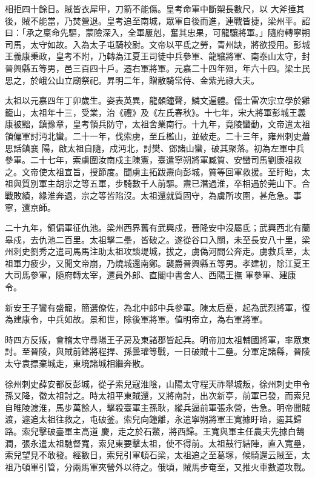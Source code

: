 \begin{pinyinscope}
 相拒四十餘日。賊皆衣犀甲，刀箭不能傷。皇考命軍中斷槊長數尺，以
 大斧捶其後，賊不能當，乃焚營退。皇考追至南城，眾軍自後而進，連戰皆捷，梁州平。詔曰：「承之稟命先驅，蒙險深入，全軍屢剋，奮其忠果，可龍驤將軍。」隨府轉寧朔司馬，太守如故。入為太子屯騎校尉。文帝以平氐之勞，青州缺，將欲授用。彭城王義康秉政，皇考不附，乃轉為江夏王司徒中兵參軍、龍驤將軍、南泰山太守，封晉興縣五等男，邑三百四十戶。遷右軍將軍。元嘉二十四年殂，年六十四。梁土民思之，於峨公山立廟祭祀。昇明二年，贈散騎常侍、金紫光祿大夫。



 太祖以元嘉四年丁卯歲生。姿表英異，龍顙鐘聲，鱗文遍體。儒士雷次宗立學於雞籠山，太祖年十三，受業，治《禮》及《左氏春秋》。十七年，宋大將軍彭城王義康被黜，鎮豫章，皇考領兵防守，太祖舍業南行。十九年，竟陵蠻動，文帝遣太祖領偏軍討沔北蠻。二十一年，伐索虜，至丘檻山，並破走。二十三年，雍州刺史蕭思話鎮襄
 陽，啟太祖自隨，戍沔北，討樊、鄧諸山蠻，破其聚落。初為左軍中兵參軍。二十七年，索虜圍汝南戍主陳憲，臺遣寧朔將軍臧質、安蠻司馬劉康祖救之。文帝使太祖宣旨，授節度。聞虜主拓跋燾向彭城，質等回軍救援。至盱眙，太祖與質別軍主胡宗之等五軍，步騎數千人前驅。燾已潛過淮，卒相遇於莞山下。合戰敗績，緣淮奔退，宗之等皆陷沒。太祖還就質固守，為虜所攻圍，甚危急。事寧，還京師。



 二十九年，領偏軍征仇池。梁州西界舊有武興戍，晉隆安中沒屬氐；武興西北有蘭皋戍，去仇池二百里。太祖擊二壘，皆破之。遂從谷口入關，未至長安八十里，梁州刺史劉秀之遣司馬馬注助太祖攻談堤城，拔之，虜偽河間公奔走。虜救兵至，太祖軍力疲少，又聞文帝崩，乃燒城還南鄭。襲爵晉興縣五等男。孝建初，除江夏王大司馬參軍，隨府轉太宰，遷員外郎、直閣中書舍人、西陽王撫
 軍參軍、建康令。



 新安王子鸞有盛寵，簡選僚佐，為北中郎中兵參軍。陳太后憂，起為武烈將軍，復為建康令，中兵如故。景和世，除後軍將軍。值明帝立，為右軍將軍。



 時四方反叛，會稽太守尋陽王子房及東諸郡皆起兵。明帝加太祖輔國將軍，率眾東討。至晉陵，與賊前鋒將程捍、孫曇瓘等戰，一日破賊十二壘。分軍定諸縣，晉陵太守袁摽棄城走，東境諸城相繼奔散。



 徐州刺史薛安都反彭城，從子索兒寇淮陰，山陽太守程天祚舉城叛，徐州刺史申令孫又降，徵太祖討之。時太祖平東賊還，又將南討，出次新亭，前軍已發，而索兒自睢陵渡淮，馬步萬餘人，擊殺臺軍主孫耿，縱兵逼前軍張永營，告急。明帝聞賊渡，遽追太祖往救之，屯破釜。索兒向鐘離，永遣寧朔將軍王寬據盱眙，遏其歸路。索兒擊破臺軍主高道
 慶，走之於石鱉，將西歸。王寬與軍主任農夫先據白鵠澗，張永遣太祖馳督寬，索兒東要擊太祖，使不得前。太祖鼓行結陣，直入寬壘，索兒望見不敢發。經數日，索兒引軍頓石梁，太祖追之至葛塚，候騎還云賊至，太祖乃頓軍引管，分兩馬軍夾營外以待之。俄頃，賊馬步奄至，又推火車數道攻戰。




\end{pinyinscope}
